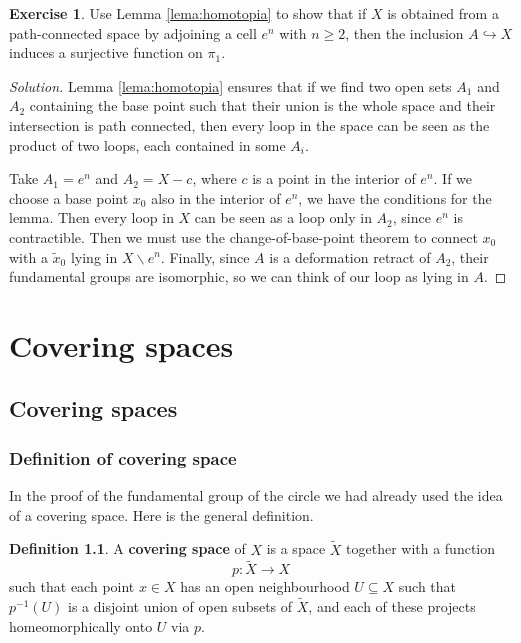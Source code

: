 \documentclass{book}
\theoremstyle{definition}
\newtheorem*{defn}{Definition}
\newtheorem*{ejer}{Exercise}
\begin{document}
\begin{ejer}
Use Lemma \ref{lema:homotopia} to show that if $X$ is
obtained from a path-connected space by adjoining a cell
$e^n$ with $n\geq2$, then the inclusion $A\hookrightarrow X$
induces a surjective function on $\pi_1$.
\end{ejer}

\begin{proof}[Solution]
Lemma \ref{lema:homotopia} ensures that if we find two open
sets $A_1$ and $A_2$ containing the base point such that
their union is the whole space and their intersection is path
connected, then every loop in the space can be seen as the
product of two loops, each contained in some $A_i$.

Take $A_1=e^n$ and $A_2=X-c$, where $c$ is a point in the
interior of $e^n$. If we choose a base point $x_0$ also in
the interior of $e^n$, we have the conditions for the lemma.
Then every loop in $X$ can be seen as a loop only in $A_2$,
since $e^n$ is contractible. Then we must use the
change-of-base-point theorem to connect $x_0$ with a
$\tilde{x}_0$ lying in $X\backslash e^n$. Finally, since $A$
is a deformation retract of $A_2$, their fundamental groups
are isomorphic, so we can think of our loop as lying in $A$.
\end{proof}

\part{Covering spaces}

\chapter{Covering spaces}

\section{Definition of covering space}

In the proof of the fundamental group of the circle we had
already used the idea of a covering space. Here is the
general definition.

\begin{defn}
A \textbf{covering space} of $X$ is a space $\tilde X$
together with a function
$$
p:\tilde X\to X
$$
such that each point $x\in X$ has an open neighbourhood
$U\subseteq X$ such that $p^{-1}(U)$ is a disjoint union of
open subsets of $\tilde X$, and each of these projects
homeomorphically onto $U$ via $p$.
\end{defn}
\end{document}
